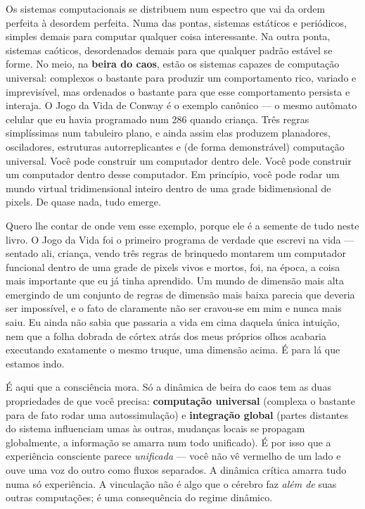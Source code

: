 \documentclass[11pt, twoside, openright]{book}
\begin{document}
Os sistemas computacionais se distribuem num espectro que vai da ordem perfeita à desordem perfeita. Numa das pontas, sistemas estáticos e periódicos, simples demais para computar qualquer coisa interessante. Na outra ponta, sistemas caóticos, desordenados demais para que qualquer padrão estável se forme. No meio, na \textbf{beira do caos}, estão os sistemas capazes de computação universal: complexos o bastante para produzir um comportamento rico, variado e imprevisível, mas ordenados o bastante para que esse comportamento persista e interaja. O Jogo da Vida de Conway é o exemplo canônico --- o mesmo autômato celular que eu havia programado num 286 quando criança. Três regras simplíssimas num tabuleiro plano, e ainda assim elas produzem planadores, osciladores, estruturas autorreplicantes e (de forma demonstrável) computação universal. Você pode construir um computador dentro dele. Você pode construir um computador dentro desse computador. Em princípio, você pode rodar um mundo virtual tridimensional inteiro dentro de uma grade bidimensional de pixels. De quase nada, tudo emerge.

Quero lhe contar de onde vem esse exemplo, porque ele é a semente de tudo neste livro. O Jogo da Vida foi o primeiro programa de verdade que escrevi na vida --- sentado ali, criança, vendo três regras de brinquedo montarem um computador funcional dentro de uma grade de pixels vivos e mortos, foi, na época, a coisa mais importante que eu já tinha aprendido. Um mundo de dimensão mais alta emergindo de um conjunto de regras de dimensão mais baixa parecia que deveria ser impossível, e o fato de claramente não ser cravou-se em mim e nunca mais saiu. Eu ainda não sabia que passaria a vida em cima daquela única intuição, nem que a folha dobrada de córtex atrás dos meus próprios olhos acabaria executando exatamente o mesmo truque, uma dimensão acima. É para lá que estamos indo.

É aqui que a consciência mora. Só a dinâmica de beira do caos tem as duas propriedades de que você precisa: \textbf{computação universal} (complexa o bastante para de fato rodar uma autossimulação) e \textbf{integração global} (partes distantes do sistema influenciam umas às outras, mudanças locais se propagam globalmente, a informação se amarra num todo unificado). É por isso que a experiência consciente parece \textit{unificada} --- você não vê vermelho de um lado e ouve uma voz do outro como fluxos separados. A dinâmica crítica amarra tudo numa só experiência. A vinculação não é algo que o cérebro faz \textit{além de} suas outras computações; é uma consequência do regime dinâmico.
\end{document}
